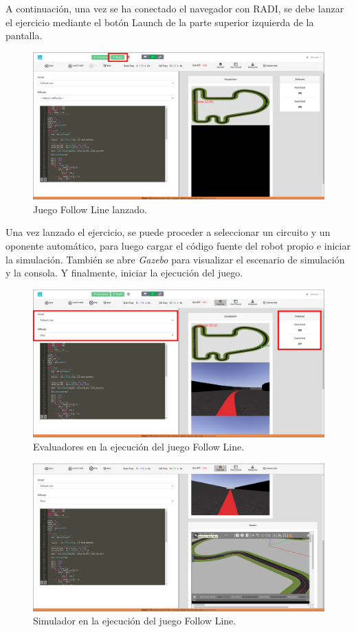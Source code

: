 \documentclass[a4paper, 12pt]{book}
\begin{document}
A continuación, una vez se ha conectado el navegador con RADI, se debe lanzar el ejercicio mediante el botón Launch de la parte superior izquierda de la pantalla.

\begin{figure}[H]
	\centering
    \includegraphics[width=\textwidth]{img/fl_connection_established_rect.png}
    \caption{Juego Follow Line lanzado.}
\end{figure}

Una vez lanzado el ejercicio, se puede proceder a seleccionar un circuito y un oponente automático, para luego cargar el código fuente del robot propio e iniciar la simulación. También se abre \emph{Gazebo} para visualizar el escenario de simulación y la consola. Y finalmente, iniciar la ejecución del juego.

\begin{figure}[H]
	\centering
    \includegraphics[width=\textwidth]{img/fl_sim_1_rect.png}
    \caption{Evaluadores en la ejecución del juego Follow Line.}
\end{figure}

\begin{figure}[H]
	\centering
    \includegraphics[width=\textwidth]{img/fl_sim_2.png}
    \caption{Simulador en la ejecución del juego Follow Line.}
\end{figure}
\end{document}
